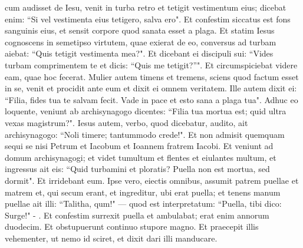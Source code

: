 \begin{biblechapter}
\verse cum audisset de Iesu, venit in turba retro et tetigit vestimentum eius; 
\verse dicebat enim: “Si vel vestimenta eius tetigero, salva ero". 
\verse Et confestim siccatus est fons sanguinis eius, et sensit corpore quod sanata esset a plaga. 
\verse Et statim Iesus cognoscens in semetipso virtutem, quae exierat de eo, conversus ad turbam aiebat: “Quis tetigit vestimenta mea?". 
\verse Et dicebant ei discipuli sui: “Vides turbam comprimentem te et dicis: “Quis me tetigit?”". 
\verse Et circumspiciebat videre eam, quae hoc fecerat. 
\verse Mulier autem timens et tremens, sciens quod factum esset in se, venit et procidit ante eum et dixit ei omnem veritatem. 
\verse Ille autem dixit ei: “Filia, fides tua te salvam fecit. Vade in pace et esto sana a plaga tua". 
\verse Adhuc eo loquente, veniunt ab archisynagogo dicentes: “Filia tua mortua est; quid ultra vexas magistrum?". 
\verse Iesus autem, verbo, quod dicebatur, audito, ait archisynagogo: “Noli timere; tantummodo crede!". 
\verse Et non admisit quemquam sequi se nisi Petrum et Iacobum et Ioannem fratrem Iacobi.  
\verse Et veniunt ad domum archisynagogi; et videt tumultum et flentes et eiulantes multum, 
\verse et ingressus ait eis: “Quid turbamini et ploratis? Puella non est mortua, sed dormit". 
\verse Et irridebant eum. Ipse vero, eiectis omnibus, assumit patrem puellae et matrem et, qui secum erant, et ingreditur, ubi erat puella; 
\verse et tenens manum puellae ait illi: “Talitha, qum!" — quod est interpretatum: “Puella, tibi dico: Surge!" - . 
\verse Et confestim surrexit puella et ambulabat; erat enim annorum duodecim. Et obstupuerunt continuo stupore magno. 
\verse Et praecepit illis vehementer, ut nemo id sciret, et dixit dari illi manducare. 
\end{biblechapter}

